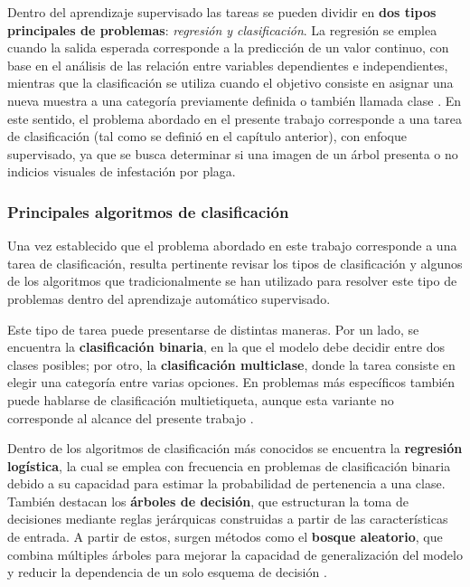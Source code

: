         Dentro del aprendizaje supervisado las tareas se pueden dividir en  \textbf{dos tipos principales de problemas}: \textit{regresión y clasificación}. La regresión se emplea cuando la salida esperada corresponde a la predicción de un valor continuo, con base en el análisis de las relación entre variables dependientes e independientes, mientras que la clasificación se utiliza cuando el objetivo consiste en asignar una nueva muestra a una categoría previamente definida o también llamada clase \cite{belcic2026supervised_learning}. En este sentido, el problema abordado en el presente trabajo corresponde a una tarea de clasificación (tal como se definió en el capítulo anterior), con enfoque supervisado, ya que se busca determinar si una imagen de un árbol presenta o no indicios visuales de infestación por plaga.
        
        \subsubsection{Principales algoritmos de clasificación}
        
        Una vez establecido que el problema abordado en este trabajo corresponde a una tarea de clasificación, resulta pertinente revisar los tipos de clasificación y algunos de los algoritmos que tradicionalmente se han utilizado para resolver este tipo de problemas dentro del aprendizaje automático supervisado. 
        
        Este tipo de tarea puede presentarse de distintas maneras. Por un lado, se encuentra la \textbf{clasificación binaria}, en la que el modelo debe decidir entre dos clases posibles; por otro, la \textbf{clasificación multiclase}, donde la tarea consiste en elegir una categoría entre varias opciones. En problemas más específicos también puede hablarse de clasificación multietiqueta, aunque esta variante no corresponde al alcance del presente trabajo \cite{belcic2026classification_ml}.

        Dentro de los algoritmos de clasificación más conocidos se encuentra la \textbf{regresión logística}, la cual se emplea con frecuencia en problemas de clasificación binaria debido a su capacidad para estimar la probabilidad de pertenencia a una clase. También destacan los \textbf{árboles de decisión}, que estructuran la toma de decisiones mediante reglas jerárquicas construidas a partir de las características de entrada. A partir de estos, surgen métodos como el \textbf{bosque aleatorio}, que combina múltiples árboles para mejorar la capacidad de generalización del modelo y reducir la dependencia de un solo esquema de decisión \cite{belcic2026classification_ml}.
        
